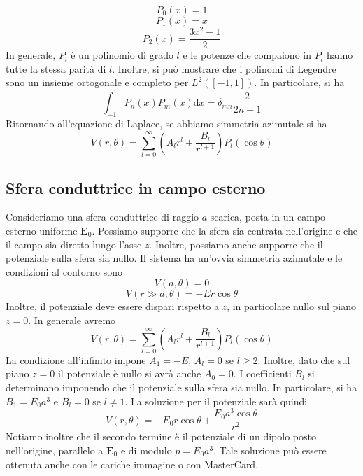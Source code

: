 \documentclass[a4paper,11pt]{book}
\newcommand{\dif}{\mathrm{d}}
\renewcommand{\vec}[1]{\mathbf{#1}}
\theoremstyle{theorem}
\theoremstyle{definition}
\begin{document}
\[P_0(x)=1\]
\[P_1(x)=x\]
\[P_2(x)=\frac{3x^2-1}{2}\]
In generale, $P_l$ è un polinomio di grado $l$ e le potenze che compaiono in $P_l$ hanno tutte la stessa parità di $l$. Inoltre, si può mostrare che i polinomi di Legendre sono un insieme ortogonale e completo per $L^2([-1,1])$. In particolare, si ha
\[\int_{-1}^{1}P_n(x)P_m(x)\dif x=\delta_{mn}\frac{2}{2n+1}\]
Ritornando all'equazione di Laplace, se abbiamo simmetria azimutale si ha
\[V(r,\theta)=\sum_{l=0}^{\infty}\left(A_lr^l+\frac{B_l}{r^{l+1}}\right)P_l(\cos\theta)\]
\subsection{Sfera conduttrice in campo esterno}
Consideriamo una sfera conduttrice di raggio $a$ scarica, posta in un campo esterno uniforme $\vec{E}_0$. Possiamo supporre che la sfera sia centrata nell'origine e che il campo sia diretto lungo l'asse $z$. Inoltre, possiamo anche supporre che il potenziale sulla sfera sia nullo. Il sistema ha un'ovvia simmetria azimutale e le condizioni al contorno sono
\[V(a,\theta)=0\]
\[V(r\gg a,\theta)=-Er\cos\theta\]
Inoltre, il potenziale deve essere dispari rispetto a $z$, in particolare nullo sul piano $z=0$. In generale avremo
\[V(r,\theta)=\sum_{l=0}^{\infty}\left(A_lr^l+\frac{B_l}{r^{l+1}}\right)P_l(\cos\theta)\]
La condizione all'infinito impone $A_1=-E$, $A_l=0$ se $l\geq 2$. Inoltre, dato che sul piano $z=0$ il potenziale è nullo si avrà anche $A_0=0$. I coefficienti $B_l$ si determinano imponendo che il potenziale sulla sfera sia nullo. In particolare, si ha $B_1=E_0a^3$ e $B_l=0$ se $l\neq 1$. La soluzione per il potenziale sarà quindi
\[V(r,\theta)=-E_0r\cos\theta+\frac{E_0a^3\cos\theta}{r^2}\]
Notiamo inoltre che il secondo termine è il potenziale di un dipolo posto nell'origine, parallelo a $\vec{E}_0$ e di modulo $p=E_0a^3$. Tale soluzione può essere ottenuta anche con le cariche immagine o con MasterCard.
\end{document}
